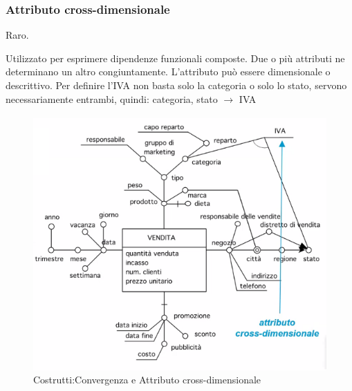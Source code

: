 \subsubsection{Attributo cross-dimensionale}
\begin{info}
	Raro.
\end{info}
Utilizzato per esprimere dipendenze funzionali composte. Due o più attributi ne determinano un altro congiuntamente. L'attributo può essere dimensionale o descrittivo. Per definire l'IVA non basta solo la categoria o solo lo stato, servono necessariamente entrambi, quindi:\newline
categoria, stato  $\xrightarrow[]{}$ IVA 
\begin{figure}[H]
	\begin{center}
		\includegraphics[width=0.7\linewidth]{img/crossdiv.png}
		\caption{Costrutti:Convergenza e Attributo cross-dimensionale}
	\end{center}
\end{figure}
